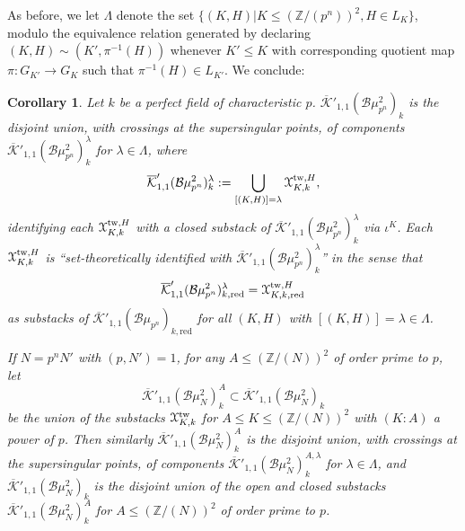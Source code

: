 \documentclass[11pt]{amsart}
\newtheorem{corollary}[subsection]{Corollary}
\theoremstyle{definition}
\begin{document}
As before, we let $\Lambda$ denote the set $\{(K,H)|K\leq (\mathbb{Z}/(p^n))^2,H \in L_K\}$, modulo the equivalence relation generated by declaring $(K,H) \sim (K',\pi^{-1}(H))$ whenever $K' \leq K$ with corresponding quotient map $\pi:G_{K'} \rightarrow G_K$ such that $\pi^{-1}(H) \in L_{K'}$. We conclude:
\begin{corollary}
Let $k$ be a perfect field of characteristic $p$. $\overline{\mathcal{K}}'_{1,1}({\mathcal{B}} \mu_{p^n}^2)_{k}$ is the disjoint union, with crossings at the supersingular points, of components $\overline{\mathcal{K}}'_{1,1}({\mathcal{B}}\mu_{p^n}^2)^\lambda_k$ for $\lambda \in \Lambda$, where 
\begin{displaymath}
\overline{\mathcal{K}}'_{1,1}({\mathcal{B}}\mu_{p^n}^2)^\lambda_k := \bigcup_{[(K,H)] = \lambda} {\mathbf{\EuScript{X}}}^{\mathrm{tw},H}_{K,k},
\end{displaymath}
identifying each ${\mathbf{\EuScript{X}}}^{\mathrm{tw},H}_{K,k}$ with a closed substack of $\overline{\mathcal{K}}'_{1,1}({\mathcal{B}}\mu_{p^n}^2)^\lambda_k$ via $\iota^K$. Each ${\mathbf{\EuScript{X}}}^{\mathrm{tw},H}_{K,k}$ is ``set-theoretically identified with $\overline{\mathcal{K}}'_{1,1}({\mathcal{B}}\mu_{p^n}^2)^\lambda_k$'' in the sense that 
\begin{displaymath}
\overline{\mathcal{K}}'_{1,1}({\mathcal{B}}\mu_{p^n}^2)^\lambda_{k,\mathrm{red}} = {\mathbf{\EuScript{X}}}^{\mathrm{tw},H}_{K,k,\mathrm{red}} 
\end{displaymath}
as substacks of $\overline{\mathcal{K}}'_{1,1}({\mathcal{B}}\mu_{p^n})_{k,\mathrm{red}}$ for all $(K,H)$ with $[(K,H)] = \lambda \in \Lambda$.

If $N = p^nN'$ with $(p,N') = 1$, for any $A \leq (\mathbb{Z}/(N))^2$ of order prime to $p$, let 
\begin{displaymath}
\overline{\mathcal{K}}'_{1,1}({\mathcal{B}}\mu_N^2)^A_k \subset \overline{\mathcal{K}}'_{1,1}({\mathcal{B}}\mu_N^2)_k
\end{displaymath}
be the union of the substacks ${\mathbf{\EuScript{X}}}^{\mathrm{tw}}_{K,k}$ for $A \leq K \leq (\mathbb{Z}/(N))^2$ with $(K:A)$ a power of $p$. Then similarly $\overline{\mathcal{K}}'_{1,1}({\mathcal{B}}\mu_N^2)^A_k$ is the disjoint union, with crossings at the supersingular points, of components $\overline{\mathcal{K}}'_{1,1}({\mathcal{B}}\mu_N^2)^{A,\lambda}_k$ for $\lambda \in \Lambda$, and $\overline{\mathcal{K}}'_{1,1}({\mathcal{B}}\mu_N^2)_k$ is the disjoint union of the open and closed substacks $\overline{\mathcal{K}}'_{1,1}({\mathcal{B}}\mu_N^2)^A_k$ for $A \leq (\mathbb{Z}/(N))^2$ of order prime to $p$.
\end{corollary}
\end{document}
